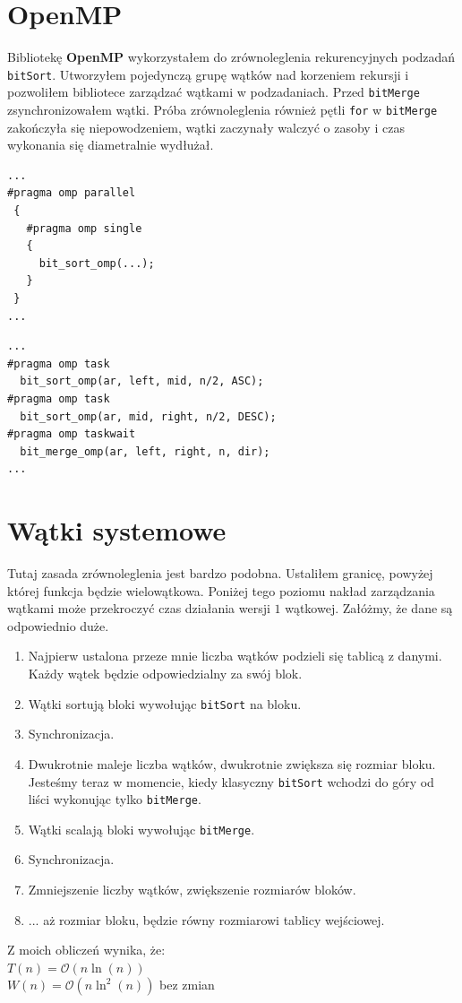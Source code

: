 \documentclass{article}
\begin{document}
\section*{OpenMP}
Bibliotekę \textbf{OpenMP} wykorzystałem do zrównoleglenia rekurencyjnych podzadań \texttt{bitSort}. Utworzyłem pojedynczą grupę wątków nad korzeniem rekursji i pozwoliłem bibliotece zarządzać wątkami w podzadaniach. Przed \texttt{bitMerge} zsynchronizowałem wątki. Próba zrównoleglenia również pętli \texttt{for} w \texttt{bitMerge} zakończyła się niepowodzeniem, wątki zaczynały walczyć o zasoby i czas wykonania się diametralnie wydłużał.
\begin{multicols}{2}
\begin{verbatim}
...
#pragma omp parallel
 {
   #pragma omp single 
   {
     bit_sort_omp(...);
   }
 }
...
\end{verbatim}
\columnbreak
\begin{verbatim}
...
#pragma omp task
  bit_sort_omp(ar, left, mid, n/2, ASC);
#pragma omp task
  bit_sort_omp(ar, mid, right, n/2, DESC);
#pragma omp taskwait
  bit_merge_omp(ar, left, right, n, dir);
...
\end{verbatim}
\end{multicols}

\section*{Wątki systemowe}
Tutaj zasada zrównoleglenia jest bardzo podobna. Ustaliłem granicę, powyżej której funkcja będzie wielowątkowa. Poniżej tego poziomu nakład zarządzania wątkami może przekroczyć czas działania wersji $1$ wątkowej. Załóżmy, że dane są odpowiednio duże. 
\begin{enumerate}
    \item Najpierw ustalona przeze mnie liczba wątków podzieli się tablicą z danymi. Każdy wątek będzie odpowiedzialny za swój blok.
    \item Wątki sortują bloki wywołując \texttt{bitSort} na bloku.
    \item Synchronizacja.
    \item Dwukrotnie maleje liczba wątków, dwukrotnie zwiększa się rozmiar bloku. Jesteśmy teraz w momencie, kiedy klasyczny \texttt{bitSort} wchodzi do góry od liści wykonując tylko \texttt{bitMerge}.
    \item Wątki scalają bloki wywołując \texttt{bitMerge}.
    \item Synchronizacja.
    \item Zmniejszenie liczby wątków, zwiększenie rozmiarów bloków.
    \item ... aż rozmiar bloku, będzie równy rozmiarowi tablicy wejściowej.
\end{enumerate}
Z moich obliczeń wynika, że: \\
$T(n) = \mathcal{O}(n\ln(n))$ \\
$W(n) = \mathcal{O}(n\ln^2(n))$ bez zmian
\end{document}
